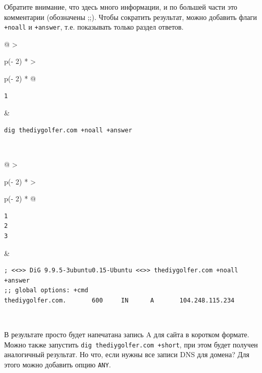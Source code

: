 \documentclass{article}
\begin{document}
Обратите внимание, что здесь много информации, и по большей части это
комментарии (обозначены ;;). Чтобы сократить результат, можно добавить
флаги \texttt{+noall} и \texttt{+answer}, т.е. показывать только раздел
ответов.

\begin{longtable}[]{@{}
  >{\raggedright\arraybackslash}p{(\columnwidth - 2\tabcolsep) * }
  >{\raggedright\arraybackslash}p{(\columnwidth - 2\tabcolsep) * }@{}}
\toprule
\endhead
\begin{minipage}[t]{\linewidth}\raggedright
\begin{verbatim}
1
\end{verbatim}
\end{minipage} & \begin{minipage}[t]{\linewidth}\raggedright
\begin{verbatim}
dig thediygolfer.com +noall +answer
\end{verbatim}
\end{minipage} \\ \addlinespace
\bottomrule
\end{longtable}

\begin{longtable}[]{@{}
  >{\raggedright\arraybackslash}p{(\columnwidth - 2\tabcolsep) * }
  >{\raggedright\arraybackslash}p{(\columnwidth - 2\tabcolsep) * }@{}}
\toprule
\endhead
\begin{minipage}[t]{\linewidth}\raggedright
\begin{verbatim}
1
2
3
\end{verbatim}
\end{minipage} & \begin{minipage}[t]{\linewidth}\raggedright
\begin{verbatim}
; <<>> DiG 9.9.5-3ubuntu0.15-Ubuntu <<>> thediygolfer.com +noall +answer
;; global options: +cmd
thediygolfer.com.       600     IN      A       104.248.115.234
\end{verbatim}
\end{minipage} \\ \addlinespace
\bottomrule
\end{longtable}

В результате просто будет напечатана запись A для сайта в коротком
формате. Можно также запустить \texttt{dig\ thediygolfer.com\ +short},
при этом будет получен аналогичный результат. Но что, если нужны все
записи DNS для домена? Для этого можно добавить опцию \texttt{ANY}.
\end{document}
